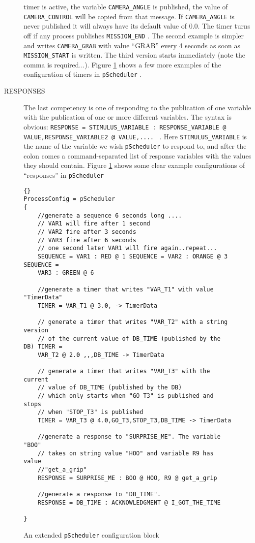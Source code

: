 \documentclass[a4paper,10pt]{article}
\newcommand{\Code}[1]{\texttt{#1} }
\newcommand{\code}[1]{\Code{#1} }
\begin{document}
\begin{description}
timer is active, the variable \code{CAMERA\_ANGLE} is published,
the value of \code{CAMERA\_CONTROL} will be copied from that
message. If \code{CAMERA\_ANGLE} is never published it will always
have its default value of $0.0$. The timer turns off if any
process publishes \code{MISSION\_END}. The second example is
simpler and writes \code{CAMERA\_GRAB} with value ``GRAB'' every 4
seconds as soon as \code{MISSION\_START} is written. The third
version starts immediately (note the comma is required...). Figure
\ref{Fig:SchedulerExt} shows a few more examples of the
configuration of timers in  \code{pScheduler}.
\item[RESPONSES] The last competency is one of responding to the
publication of one variable with the publication of one or more
different variables. The syntax is obvious: \code{RESPONSE =
STIMULUS\_VARIABLE : RESPONSE\_VARIABLE @
VALUE,RESPONSE\_VARIABLE2 @ VALUE,....  }. Here 
\code{STIMULUS\_VARIABLE} is the name of the variable we wish
\code{pScheduler} to respond to, and after the colon comes a
command-separated list of response variables with the values they
should contain. Figure \ref{Fig:SchedulerExt} shows some clear
example configurations of ``responses'' in \code{pScheduler}
\end{description}

\begin{figure}
\label{Fig:SchedulerExt}
\begin{lstlisting}[]{}
ProcessConfig = pScheduler
{
    //generate a sequence 6 seconds long ....
    // VAR1 will fire after 1 second
    // VAR2 fire after 3 seconds
    // VAR3 fire after 6 seconds
    // one second later VAR1 will fire again..repeat...
    SEQUENCE = VAR1 : RED @ 1 SEQUENCE = VAR2 : ORANGE @ 3 SEQUENCE =
    VAR3 : GREEN @ 6

    //generate a timer that writes "VAR_T1" with value "TimerData"
    TIMER = VAR_T1 @ 3.0, -> TimerData

    // generate a timer that writes "VAR_T2" with a string version
    // of the current value of DB_TIME (published by the DB) TIMER =
    VAR_T2 @ 2.0 ,,,DB_TIME -> TimerData

    // generate a timer that writes "VAR_T3" with the current
    // value of DB_TIME (published by the DB)
    // which only starts when "GO_T3" is published and stops
    // when "STOP_T3" is published
    TIMER = VAR_T3 @ 4.0,GO_T3,STOP_T3,DB_TIME -> TimerData

    //generate a response to "SURPRISE_ME". The variable "BOO"
    // takes on string value "HOO" and variable R9 has value
    //"get_a_grip"
    RESPONSE = SURPRISE_ME : BOO @ HOO, R9 @ get_a_grip

    //generate a response to "DB_TIME".
    RESPONSE = DB_TIME : ACKNOWLEDGMENT @ I_GOT_THE_TIME

}
\end{lstlisting}\caption{An extended \code{pScheduler} configuration block}
\end{figure}
\end{document}
